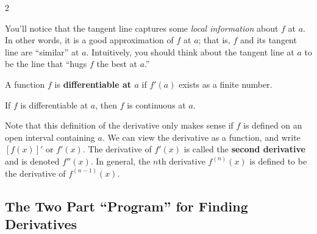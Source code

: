 \begin{multicols}{2}
{

}

\end{multicols}


You'll notice that the tangent line captures some \textit{local information} about $f$ at $a$. In other words, it is a good approximation of $f$ at $a$; that is, $f$ and its tangent line are ``similar'' at $a$. Intuitively, you should think about the tangent line at $a$ to be the line that ``hugs $f$ the best at $a$.''

A function $f$ is \textbf{differentiable at $a$} if $f'(a)$ exists as a finite number.

\begin{thm}
If $f$ is differentiable at $a$, then $f$ is continuous at $a$.
\end{thm}

Note that this definition of the derivative only makes sense if $f$ is defined on an open interval containing $a$. We can view the derivative as a function, and write $[f(x)]'$ or $f'(x)$. The derivative of $f'(x)$ is called the \textbf{second derivative} and is denoted $f''(x)$. In general, the $n$th derivative $f^{(n)}(x)$ is defined to be the derivative of $f^{(n-1)}(x)$.

\subsection{The Two Part ``Program'' for Finding Derivatives}

